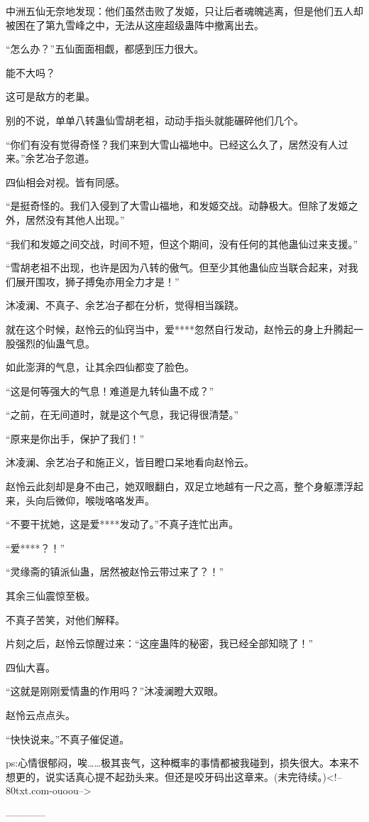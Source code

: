 \begin{this_body}
中洲五仙无奈地发现：他们虽然击败了发姬，只让后者魂魄逃离，但是他们五人却被困在了第九雪峰之中，无法从这座超级蛊阵中撤离出去。

“怎么办？”五仙面面相觑，都感到压力很大。

能不大吗？

这可是敌方的老巢。

别的不说，单单八转蛊仙雪胡老祖，动动手指头就能碾碎他们几个。

“你们有没有觉得奇怪？我们来到大雪山福地中。已经这么久了，居然没有人过来。”余艺冶子忽道。

四仙相会对视。皆有同感。

“是挺奇怪的。我们入侵到了大雪山福地，和发姬交战。动静极大。但除了发姬之外，居然没有其他人出现。”

“我们和发姬之间交战，时间不短，但这个期间，没有任何的其他蛊仙过来支援。”

“雪胡老祖不出现，也许是因为八转的傲气。但至少其他蛊仙应当联合起来，对我们展开围攻，狮子搏兔亦用全力才是！”

沐凌澜、不真子、余艺冶子都在分析，觉得相当蹊跷。

就在这个时候，赵怜云的仙窍当中，爱****忽然自行发动，赵怜云的身上升腾起一股强烈的仙蛊气息。

如此澎湃的气息，让其余四仙都变了脸色。

“这是何等强大的气息！难道是九转仙蛊不成？”

“之前，在无间道时，就是这个气息，我记得很清楚。”

“原来是你出手，保护了我们！”

沐凌澜、余艺冶子和施正义，皆目瞪口呆地看向赵怜云。

赵怜云此刻却是身不由己，她双眼翻白，双足立地越有一尺之高，整个身躯漂浮起来，头向后微仰，喉咙咯咯发声。

“不要干扰她，这是爱****发动了。”不真子连忙出声。

“爱****？！”

“灵缘斋的镇派仙蛊，居然被赵怜云带过来了？！”

其余三仙震惊至极。

不真子苦笑，对他们解释。

片刻之后，赵怜云惊醒过来：“这座蛊阵的秘密，我已经全部知晓了！”

四仙大喜。

“这就是刚刚爱情蛊的作用吗？”沐凌澜瞪大双眼。

赵怜云点点头。

“快快说来。”不真子催促道。

ps:心情很郁闷，唉……极其丧气，这种概率的事情都被我碰到，损失很大。本来不想更的，说实话真心提不起劲头来。但还是咬牙码出这章来。(未完待续。)<!--80txt.com-ouoou-->

------------

\end{this_body}

